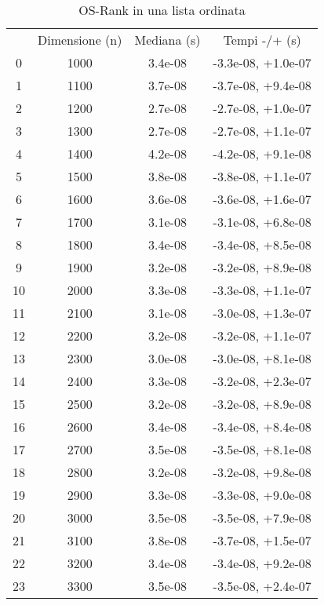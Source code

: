 \begin{table}
\centering
\caption{OS-Rank in una lista ordinata}
\label{OS-Rank in una lista ordinata}
\begin{adjustbox}{width=1\textwidth/2}
\begin{tabular}{|c|c|c|c|}
\hline
 & Dimensione (n) & Mediana (s) & Tempi -/+ (s) \\
0 & 1000 & 3.4e-08 & -3.3e-08, +1.0e-07 \\
\cline{1-4}
1 & 1100 & 3.7e-08 & -3.7e-08, +9.4e-08 \\
\cline{1-4}
2 & 1200 & 2.7e-08 & -2.7e-08, +1.0e-07 \\
\cline{1-4}
3 & 1300 & 2.7e-08 & -2.7e-08, +1.1e-07 \\
\cline{1-4}
4 & 1400 & 4.2e-08 & -4.2e-08, +9.1e-08 \\
\cline{1-4}
5 & 1500 & 3.8e-08 & -3.8e-08, +1.1e-07 \\
\cline{1-4}
6 & 1600 & 3.6e-08 & -3.6e-08, +1.6e-07 \\
\cline{1-4}
7 & 1700 & 3.1e-08 & -3.1e-08, +6.8e-08 \\
\cline{1-4}
8 & 1800 & 3.4e-08 & -3.4e-08, +8.5e-08 \\
\cline{1-4}
9 & 1900 & 3.2e-08 & -3.2e-08, +8.9e-08 \\
\cline{1-4}
10 & 2000 & 3.3e-08 & -3.3e-08, +1.1e-07 \\
\cline{1-4}
11 & 2100 & 3.1e-08 & -3.0e-08, +1.3e-07 \\
\cline{1-4}
12 & 2200 & 3.2e-08 & -3.2e-08, +1.1e-07 \\
\cline{1-4}
13 & 2300 & 3.0e-08 & -3.0e-08, +8.1e-08 \\
\cline{1-4}
14 & 2400 & 3.3e-08 & -3.2e-08, +2.3e-07 \\
\cline{1-4}
15 & 2500 & 3.2e-08 & -3.2e-08, +8.9e-08 \\
\cline{1-4}
16 & 2600 & 3.4e-08 & -3.4e-08, +8.4e-08 \\
\cline{1-4}
17 & 2700 & 3.5e-08 & -3.5e-08, +8.1e-08 \\
\cline{1-4}
18 & 2800 & 3.2e-08 & -3.2e-08, +9.8e-08 \\
\cline{1-4}
19 & 2900 & 3.3e-08 & -3.3e-08, +9.0e-08 \\
\cline{1-4}
20 & 3000 & 3.5e-08 & -3.5e-08, +7.9e-08 \\
\cline{1-4}
21 & 3100 & 3.8e-08 & -3.7e-08, +1.5e-07 \\
\cline{1-4}
22 & 3200 & 3.4e-08 & -3.4e-08, +9.2e-08 \\
\cline{1-4}
23 & 3300 & 3.5e-08 & -3.5e-08, +2.4e-07 \\

\end{tabular}
\end{adjustbox}
\end{table}
